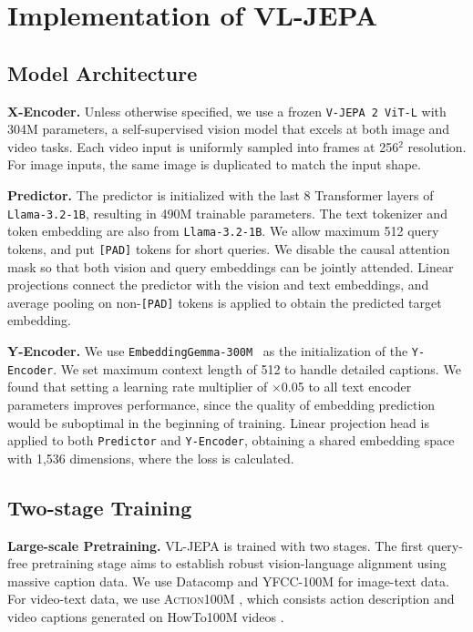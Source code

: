 
\section{Implementation of VL-JEPA}
\label{sec:implementation-details}

\subsection{Model Architecture}



\textbf{{X-Encoder}.} Unless otherwise specified, we use a frozen \texttt{V-JEPA~2 ViT-L} \citep{assran2025v} with 304M parameters, a self-supervised vision model that excels at both image and video tasks. Each video input is uniformly sampled into frames at 256$^2$ resolution. For image inputs, the same image is duplicated to match the input shape. 


\textbf{{Predictor}.} The predictor is initialized with the last 8 Transformer layers of \texttt{Llama-3.2-1B}, resulting in 490M trainable parameters. The text tokenizer and token embedding are also from \texttt{Llama-3.2-1B}. We allow maximum 512 query tokens, and put \texttt{[PAD]} tokens for short queries. We disable the causal attention mask so that both vision and query embeddings can be jointly attended. Linear projections connect the predictor with the vision and text embeddings, and average pooling on non-\texttt{[PAD]} tokens is applied to obtain the predicted target embedding.


\textbf{{Y-Encoder}.} {We use \texttt{EmbeddingGemma-300M}~\citep{vera2025embeddinggemma} as the initialization of the \texttt{Y-Encoder}. We set maximum context length of 512 to handle detailed captions. We found that setting a learning rate multiplier of $\times$0.05 to all text encoder parameters improves performance, since the quality of embedding prediction would be suboptimal in the beginning of training.} Linear projection head is applied to both \texttt{Predictor} and \texttt{Y-Encoder}, obtaining a shared embedding space with 1,536 dimensions, where the loss is calculated.

{\subsection{Two-stage Training}}

\textbf{Large-scale Pretraining.} VL-JEPA is trained with two stages. The first query-free pretraining stage aims to establish robust vision-language alignment using massive caption data. We use Datacomp \citep{gadre2023datacomp} and YFCC-100M \citep{thomee2016yfcc100m} for image-text data. For video-text data, we use \textsc{Action100M} \citep{chen2026action100m}, which consists action description and video captions generated on HowTo100M videos \citep{chen2025planning}.

